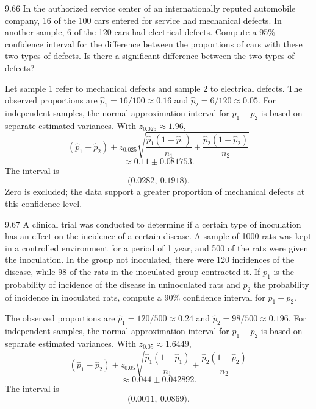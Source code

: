 \documentclass[11pt,oneside]{article}
\begin{document}
\begin{exercise}{9.66}
In the authorized service center of an internationally reputed automobile company, 16 of the 100 cars entered for service had mechanical defects. In another sample, 6 of the 120 cars had electrical defects. Compute a 95\% confidence interval for the difference between the proportions of cars with these two types of defects. Is there a significant difference between the two types of defects?
\end{exercise}
\begin{solution}
Let sample 1 refer to mechanical defects and sample 2 to electrical defects. The observed proportions are $\hat p_1=16/100\approx0.16$ and $\hat p_2=6/120\approx0.05$. For independent samples, the normal-approximation interval for $p_1-p_2$ is based on separate estimated variances. With $z_{0.025}\approx1.96$,
\[
(\hat p_1-\hat p_2)\pm z_{0.025}\sqrt{\frac{\hat p_1(1-\hat p_1)}{n_1}+\frac{\hat p_2(1-\hat p_2)}{n_2}}
\]
\[
\approx 0.11\pm0.081753.
\]
The interval is 
\[
\boxed{\bigl(0.0282,\ 0.1918\bigr)}.
\]
Zero is excluded; the data support a greater proportion of mechanical defects at this confidence level.
\end{solution}

\begin{exercise}{9.67}
A clinical trial was conducted to determine if a certain type of inoculation has an effect on the incidence of a certain disease. A sample of 1000 rats was kept in a controlled environment for a period of 1 year, and 500 of the rats were given the inoculation. In the group not inoculated, there were 120 incidences of the disease, while 98 of the rats in the inoculated group contracted it. If $p_1$ is the probability of incidence of the disease in uninoculated rats and $p_2$ the probability of incidence in inoculated rats, compute a 90\% confidence interval for $p_1-p_2$.
\end{exercise}
\begin{solution}
The observed proportions are $\hat p_1=120/500\approx0.24$ and $\hat p_2=98/500\approx0.196$. For independent samples, the normal-approximation interval for $p_1-p_2$ is based on separate estimated variances. With $z_{0.05}\approx1.6449$,
\[
(\hat p_1-\hat p_2)\pm z_{0.05}\sqrt{\frac{\hat p_1(1-\hat p_1)}{n_1}+\frac{\hat p_2(1-\hat p_2)}{n_2}}
\]
\[
\approx 0.044\pm0.042892.
\]
The interval is 
\[
\boxed{\bigl(0.0011,\ 0.0869\bigr)}.
\]
\end{solution}
\end{document}
